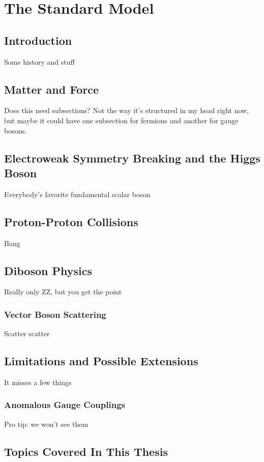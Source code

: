 

\chapter{The Standard Model}

\section{Introduction}
Some history and stuff



\section{Matter and Force}
Does this need subsections? Not the way it's structured in my head right now, but maybe it could have one subsection for fermions and another for gauge bosons.



\section{Electroweak Symmetry Breaking and the Higgs Boson}
Everybody's favorite fundamental scalar boson



\section{Proton-Proton Collisions}
\label{sec:pp}
Bang



\section{Diboson Physics}
Really only ZZ, but you get the point

\subsection{Vector Boson Scattering}
Scatter scatter


\section{Limitations and Possible Extensions}
It misses a few things

\subsection{Anomalous Gauge Couplings}
Pro tip: we won't see them



\section{Topics Covered In This Thesis}
